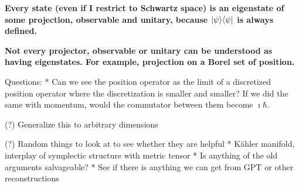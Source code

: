 \textbf{Every state (even if I restrict to Schwartz space) is an eigenstate of some projection, observable and unitary, because $|\psi \rangle \langle \psi|$ is always defined.}

\textbf{Not every projector, observable or unitary can be understood as having eigenstates. For example, projection on a Borel set of position.}


Questions:
* Can we see the position operator as the limit of a discretized position operator where the discretization is smaller and smaller? If we did the same with momentum, would the commutator between them become $\imath \hbar$.

(?) Generalize this to arbitrary dimensions

(?) Random things to look at to see whether they are helpful
* Kähler manifold, interplay of symplectic structure with metric tensor
* Is anything of the old arguments salvageable?
* See if there is anything we can get from GPT or other reconstructions



  
